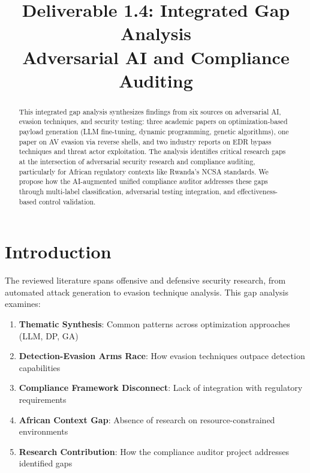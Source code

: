\documentclass[11pt,conference]{IEEEtran}
\begin{document}
\title{Deliverable 1.4: Integrated Gap Analysis\\Adversarial AI and Compliance Auditing}

\author{
}

\maketitle

\begin{abstract}
This integrated gap analysis synthesizes findings from six sources on adversarial AI, evasion techniques, and security testing: three academic papers on optimization-based payload generation (LLM fine-tuning, dynamic programming, genetic algorithms), one paper on AV evasion via reverse shells, and two industry reports on EDR bypass techniques and threat actor exploitation. The analysis identifies critical research gaps at the intersection of adversarial security research and compliance auditing, particularly for African regulatory contexts like Rwanda's NCSA standards. We propose how the AI-augmented unified compliance auditor addresses these gaps through multi-label classification, adversarial testing integration, and effectiveness-based control validation.
\end{abstract}

\section{Introduction}

The reviewed literature spans offensive and defensive security research, from automated attack generation to evasion technique analysis. This gap analysis examines:

\begin{enumerate}
    \item \textbf{Thematic Synthesis}: Common patterns across optimization approaches (LLM, DP, GA)
    \item \textbf{Detection-Evasion Arms Race}: How evasion techniques outpace detection capabilities
    \item \textbf{Compliance Framework Disconnect}: Lack of integration with regulatory requirements
    \item \textbf{African Context Gap}: Absence of research on resource-constrained environments
    \item \textbf{Research Contribution}: How the compliance auditor project addresses identified gaps
\end{enumerate}
\end{document}
